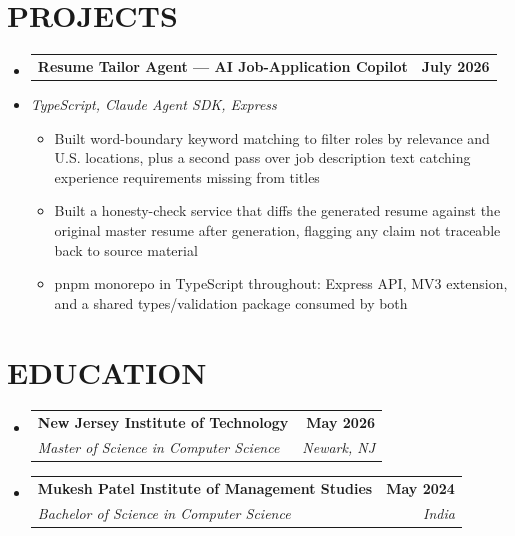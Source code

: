 \documentclass[letterpaper,11pt]{article}
\makeatletter
\newcommand{\resumeItem}[1]{
  \item\small{#1\vspace{-3pt}}
}
\newcommand{\resumeStack}[1]{
  \vspace{1pt}\item\small{\textit{#1}}\vspace{-6pt}
}
\newcommand{\resumeSubheading}[4]{
  \vspace{-3pt}\item
    \begin{tabular*}{1.0\textwidth}[t]{l@{\extracolsep{\fill}}r}
      \textbf{#1} & \textbf{\small #2} \\
      \textit{\small#3} & \textit{\small #4} \\
    \end{tabular*}\vspace{-9pt}
}
\newcommand{\resumeProjectHeading}[2]{
    \item
    \begin{tabular*}{1.001\textwidth}{l@{\extracolsep{\fill}}r}
      \small#1 & \textbf{\small #2}\\
    \end{tabular*}\vspace{-9pt}
}
\newcommand{\resumeItemListStart}{\begin{itemize}[leftmargin=0.15in, label=$\bullet$]}
\newcommand{\resumeItemListEnd}{\end{itemize}\vspace{-7pt}}
\newcommand{\resumeSubHeadingListStart}{\begin{itemize}[leftmargin=0.0in, label={}]}
\newcommand{\resumeSubHeadingListEnd}{\end{itemize}}
\makeatother
\begin{document}
\section{PROJECTS}
\resumeSubHeadingListStart

\resumeProjectHeading
{\textbf{Resume Tailor Agent — AI Job-Application Copilot}}{July 2026}
\vspace{-9pt}
\resumeStack{TypeScript, Claude Agent SDK, Express}
\resumeItemListStart
  \resumeItem{Built word-boundary keyword matching to filter roles by relevance and U.S. locations, plus a second pass over job description text catching experience requirements missing from titles}
  \resumeItem{Built a honesty-check service that diffs the generated resume against the original master resume after generation, flagging any claim not traceable back to source material}
  \resumeItem{pnpm monorepo in TypeScript throughout: Express API, MV3 extension, and a shared types/validation package consumed by both}
\resumeItemListEnd

\resumeSubHeadingListEnd
\vspace{-3pt}
\section{EDUCATION}
\vspace{1pt}
\resumeSubHeadingListStart
\vspace{5pt}
\resumeSubheading
{New Jersey Institute of Technology}{May 2026}
{Master of Science in Computer Science}{Newark, NJ}
\vspace{5pt}
\resumeSubheading
{Mukesh Patel Institute of Management Studies}{May 2024}
{Bachelor of Science in Computer Science}{India}
\resumeSubHeadingListEnd
\end{document}
